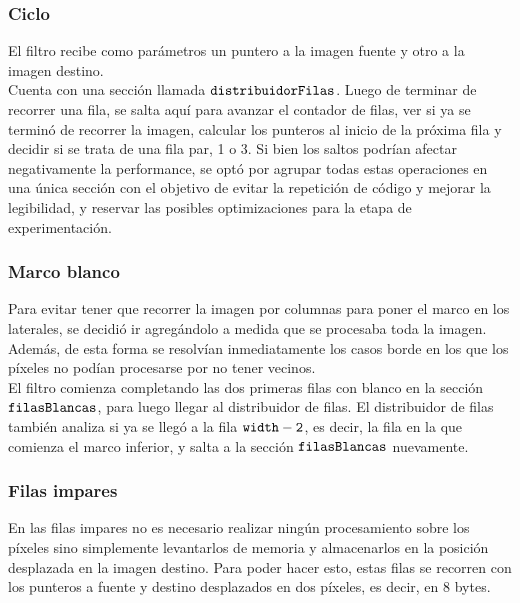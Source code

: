 \documentclass[a4paper]{article}
\begin{document}
\subsubsection{Ciclo}
El filtro recibe como parámetros un puntero a la imagen fuente y otro a la imagen destino. \\
Cuenta con una sección llamada $\tt{distribuidorFilas}$. Luego de terminar de recorrer una fila, se salta aquí para avanzar el contador de filas, ver si ya se terminó de recorrer la imagen, calcular los punteros al inicio de la próxima fila y decidir si se trata de una fila par, 1 o 3. Si bien los saltos podrían afectar negativamente la performance, se optó por agrupar todas estas operaciones en una única sección con el objetivo de evitar la repetición de código y mejorar la legibilidad, y reservar las posibles optimizaciones para la etapa de experimentación.

\subsubsection{Marco blanco}
Para evitar tener que recorrer la imagen por columnas para poner el marco en los laterales, se decidió ir agregándolo a medida que se procesaba toda la imagen. Además, de esta forma se resolvían inmediatamente los casos borde en los que los píxeles no podían procesarse por no tener vecinos. \\
El filtro comienza completando las dos primeras filas con blanco en la sección $\tt{filasBlancas}$, para luego llegar al distribuidor de filas. El distribuidor de filas también analiza si ya se llegó a la fila $\tt{width-2}$, es decir, la fila en la que comienza el marco inferior, y salta a la sección $\tt{filasBlancas}$ nuevamente.

\subsubsection{Filas impares}
En las filas impares no es necesario realizar ningún procesamiento sobre los píxeles sino simplemente levantarlos de memoria y almacenarlos en la posición desplazada en la imagen destino. Para poder hacer esto, estas filas se recorren con los punteros a fuente y destino desplazados en dos píxeles, es decir, en 8 bytes.
\end{document}
